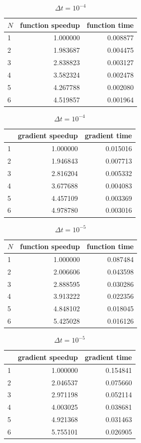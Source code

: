 \begin{table}[!h]
\centering
\caption{$\Delta t=10^{-4}$}
\begin{tabular}{lrr}
\toprule
{} $N$&  function speedup &    function  time \\
\midrule
1 &  1.000000 &  0.008877 \\
2 &  1.983687 &  0.004475 \\
3 &  2.838823 &  0.003127 \\
4 &  3.582324 &  0.002478 \\
5 &  4.267788 &  0.002080 \\
6 &  4.519857 &  0.001964 \\
\bottomrule
\end{tabular}
\begin{tabular}{lrr}
\toprule
{} &  gradient speedup &     gradient time \\
\midrule
1 &  1.000000 &  0.015016 \\
2 &  1.946843 &  0.007713 \\
3 &  2.816204 &  0.005332 \\
4 &  3.677688 &  0.004083 \\
5 &  4.457109 &  0.003369 \\
6 &  4.978780 &  0.003016 \\
\bottomrule
\end{tabular}
\end{table}
\begin{table}[!h]
\centering
\caption{$\Delta t=10^{-5}$}
\begin{tabular}{lrr}
\toprule
{}$N$ &  function speedup &    function  time \\
\midrule
1 &  1.000000 &  0.087484 \\
2 &  2.006606 &  0.043598 \\
3 &  2.888595 &  0.030286 \\
4 &  3.913222 &  0.022356 \\
5 &  4.848102 &  0.018045 \\
6 &  5.425028 &  0.016126 \\
\bottomrule
\end{tabular}
\begin{tabular}{lrr}
\toprule
{} &  gradient speedup &     gradient time \\
\midrule
1 &  1.000000 &  0.154841 \\
2 &  2.046537 &  0.075660 \\
3 &  2.971198 &  0.052114 \\
4 &  4.003025 &  0.038681 \\
5 &  4.921368 &  0.031463 \\
6 &  5.755101 &  0.026905 \\
\bottomrule
\end{tabular}
\end{table}
